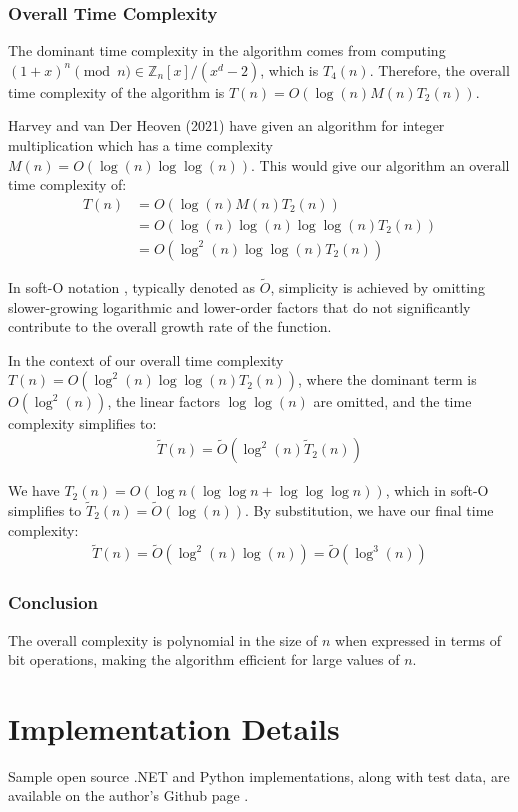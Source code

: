 \documentclass{article}
\theoremstyle{plain}
\theoremstyle{definition}
\newcommand{\Z}{\mathbb{Z}}
\begin{document}
\subsubsection{Overall Time Complexity}
The dominant time complexity in the algorithm comes from computing \( (1+x)^n \pmod{n} \in \Z_n[x]/(x^d-2) \), which is $T_4(n)$. Therefore, the overall time complexity of the algorithm is \( T(n) = O(\log(n) M(n) T_2(n)) \).

Harvey and van Der Heoven (2021) \cite{harveyvanderhoeven2021} have given an algorithm for integer multiplication which has a time complexity $M(n) = O(\log(n) \log\log(n))$. This would give our algorithm an overall time complexity of:
\begin{align}
    T(n) &= O(\log(n) M(n) T_2(n))
    \\ &= O(\log(n) \log(n) \log\log(n) T_2(n))
    \\ &= O(\log^2(n) \log\log(n) T_2(n))
\end{align}

In soft-O notation \cite{gathengerhard2013softo}, typically denoted as $\tilde{O}$, simplicity is achieved by omitting slower-growing logarithmic and lower-order factors that do not significantly contribute to the overall growth rate of the function.

In the context of our overall time complexity $T(n) = O(\log^2(n) \log\log(n) T_2(n))$, where the dominant term is \(O(\log^2(n))\), the linear factors \(\log\log(n)\) are omitted, and the time complexity simplifies to:
\begin{align}
    \tilde{T}(n) = \tilde{O}(\log^2(n) \tilde{T}_2(n))
\end{align}

We have $T_2(n) = O(\log n (\log \log n + \log \log \log n))$, which in soft-O simplifies to $\tilde{T}_2(n) = \tilde{O}(\log(n))$. By substitution, we have our final time complexity:
\begin{align}
    \tilde{T}(n) = \tilde{O}(\log^2(n) \log(n)) = \tilde{O}(\log^3(n))
\end{align}

\subsubsection{Conclusion}
The overall complexity is polynomial in the size of \( n \) when expressed in terms of bit operations, making the algorithm efficient for large values of \( n \).

\section{Implementation Details}
Sample open source .NET and Python implementations, along with test data, are available on the author's Github page \cite{githubrepo}.
\end{document}
